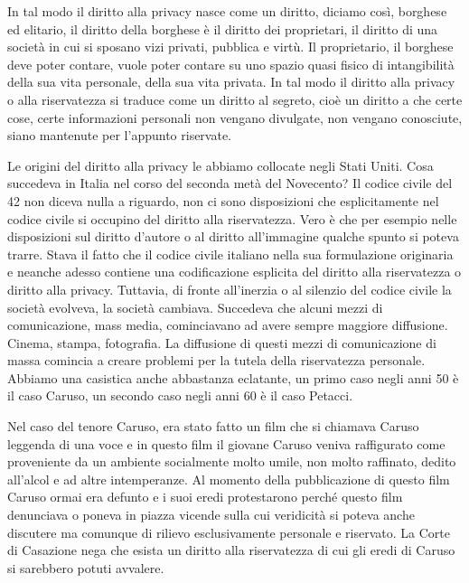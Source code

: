 In tal modo il diritto alla privacy nasce come un diritto, diciamo così, borghese ed elitario, il diritto della borghese è il diritto dei proprietari, il diritto di una società in cui si sposano vizi privati, pubblica e virtù. Il proprietario, il borghese deve poter contare, vuole poter contare su uno spazio quasi fisico di intangibilità della sua vita personale, della sua vita privata. 
In tal modo il diritto alla privacy o alla riservatezza si traduce come un diritto al segreto, cioè un diritto a che certe cose, certe informazioni personali non vengano divulgate, non vengano conosciute, siano mantenute per l'appunto riservate. 

Le origini del diritto alla privacy le abbiamo collocate negli Stati Uniti. Cosa succedeva in Italia nel corso del seconda metà del Novecento? Il codice civile del 42 non diceva nulla a riguardo, non ci sono disposizioni che esplicitamente nel codice civile si occupino del diritto alla riservatezza. Vero è che per esempio nelle disposizioni sul diritto d'autore o al diritto all'immagine qualche spunto si poteva trarre. Stava il fatto che il codice civile italiano nella sua formulazione originaria e neanche adesso contiene una codificazione esplicita del diritto alla riservatezza o diritto alla privacy. 
Tuttavia, di fronte all'inerzia o al silenzio del codice civile la società evolveva, la società cambiava. Succedeva che alcuni mezzi di comunicazione, mass media, cominciavano ad avere sempre maggiore diffusione. Cinema, stampa, fotografia. La diffusione di questi mezzi di comunicazione di massa comincia a creare problemi per la tutela della riservatezza personale. 
Abbiamo una casistica anche abbastanza eclatante, un primo caso negli anni 50 è il caso Caruso, un secondo caso negli anni 60 è il caso Petacci. 

Nel caso del tenore Caruso, era stato fatto un film che si chiamava Caruso leggenda di una voce e in questo film il giovane Caruso veniva raffigurato come proveniente da un ambiente socialmente molto umile, non molto raffinato, dedito all'alcol e ad altre intemperanze. Al momento della pubblicazione di questo film Caruso ormai era defunto e i suoi eredi protestarono perché questo film denunciava o poneva in piazza vicende sulla cui veridicità si poteva anche discutere ma comunque di rilievo esclusivamente personale e riservato. 
La Corte di Casazione nega che esista un diritto alla riservatezza di cui gli eredi di Caruso si sarebbero potuti avvalere. 

